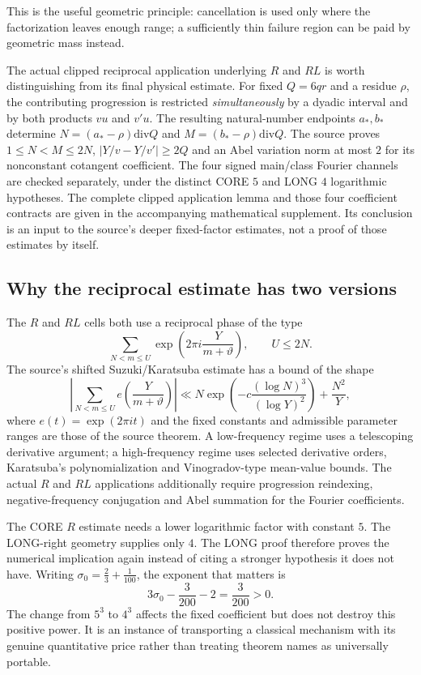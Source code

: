\documentclass[11pt]{article}
\theoremstyle{definition}
\theoremstyle{remark}
\newcommand{\1}{\mathbf 1}
\begin{document}
This is the useful geometric principle: cancellation is used only
where the factorization leaves enough range; a sufficiently thin
failure region can be paid by geometric mass instead.


The actual clipped reciprocal application underlying $R$ and $RL$
is worth distinguishing from its final physical estimate. For fixed
$Q=6qr$ and a residue $\rho$, the contributing progression is
restricted \emph{simultaneously} by a dyadic interval and by both
products $vu$ and $v'u$. The resulting natural-number endpoints
$a_*,b_*$ determine $N=(a_*-\rho)\mathbin{\mathrm{div}}Q$ and
$M=(b_*-\rho)\mathbin{\mathrm{div}}Q$. The source proves
$1\le N<M\le2N$, $|Y/v-Y/v'|\ge2Q$ and an Abel
variation norm at most $2$ for its nonconstant cotangent
coefficient. The four signed main/class Fourier channels are
checked separately, under the distinct CORE $5$ and LONG $4$
logarithmic hypotheses. The complete clipped application lemma
and those four coefficient contracts are given in the accompanying
mathematical supplement. Its conclusion is an input to the
source's deeper fixed-factor estimates, not a proof of those
estimates by itself.

\subsection{Why the reciprocal estimate has two versions}

The $R$ and $RL$ cells both use a reciprocal phase of the type
\[
 \sum_{N<m\le U}\exp\!\left(2\pi i\frac{Y}{m+\vartheta}\right),
 \qquad U\le2N.
\]
The source's shifted Suzuki/Karatsuba estimate has a bound of
the shape
\begin{equation}\label{eq:reciprocal-sum-bound}
 \left|\sum_{N<m\le U}e\!\left(\frac{Y}{m+\vartheta}\right)\right|
 \ll N\exp\!\left(-c\frac{(\log N)^3}{(\log Y)^2}\right)
   +\frac{N^2}{Y},
\end{equation}
where $e(t)=\exp(2\pi i t)$ and the fixed constants and
admissible parameter ranges are those of the source theorem.
A low-frequency regime uses a telescoping derivative argument;
a high-frequency regime uses selected derivative orders,
Karatsuba's polynomialization and Vinogradov-type mean-value
bounds. The actual $R$ and $RL$ applications additionally
require progression reindexing, negative-frequency conjugation
and Abel summation for the Fourier coefficients.

The CORE $R$ estimate needs a lower logarithmic factor with
constant $5$. The LONG-right geometry supplies only $4$.
The LONG proof therefore proves the numerical implication
again instead of citing a stronger hypothesis it does not have.
Writing $\sigma_0=\tfrac23+\tfrac1{100}$, the exponent that
matters is
\begin{equation}\label{eq:R-RL-margin}
 3\sigma_0-\frac3{200}-2=\frac3{200}>0.
\end{equation}
The change from $5^3$ to $4^3$ affects the fixed coefficient
but does not destroy this positive power. It is an instance of
transporting a classical mechanism with its genuine quantitative
price rather than treating theorem names as universally portable.
\end{document}
